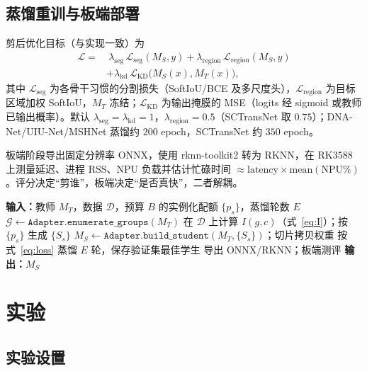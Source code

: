 \documentclass[lettersize,journal]{IEEEtran}
\begin{document}
\subsection{蒸馏重训与板端部署}
\label{sec:distill}
剪后优化目标（与实现一致）为
\begin{equation}
\label{eq:loss}
\begin{aligned}
\mathcal{L}=&\ 
\lambda_{\mathrm{seg}}\,\mathcal{L}_{\mathrm{seg}}(M_S,y)
+\lambda_{\mathrm{region}}\,\mathcal{L}_{\mathrm{region}}(M_S,y)\\
&+\lambda_{\mathrm{kd}}\,\mathcal{L}_{\mathrm{KD}}\!\big(M_S(x),M_T(x)\big),
\end{aligned}
\end{equation}
其中 $\mathcal{L}_{\mathrm{seg}}$ 为各骨干习惯的分割损失（SoftIoU/BCE 及多尺度头），$\mathcal{L}_{\mathrm{region}}$ 为目标区域加权 SoftIoU，$M_T$ 冻结；$\mathcal{L}_{\mathrm{KD}}$ 为输出掩膜的 MSE（logits 经 sigmoid 或教师已输出概率）。默认 $\lambda_{\mathrm{seg}}=\lambda_{\mathrm{kd}}=1$，$\lambda_{\mathrm{region}}=0.5$（SCTransNet 取 $0.75$）；DNA-Net/UIU-Net/MSHNet 蒸馏约 $200$ epoch，SCTransNet 约 $350$ epoch。

板端阶段导出固定分辨率 ONNX，使用 rknn-toolkit2 转为 RKNN，在 RK3588 上测量延迟、进程 RSS、NPU 负载并估计忙碌时间 $\approx\mathrm{latency}\times\mathrm{mean(NPU\%)}$。评分决定“剪谁”，板端决定“是否真快”，二者解耦。

\begin{algorithm}[!t]
\caption{可迁移 IRSTD 压缩协议}
\label{alg:main}
\begin{algorithmic}
\STATE \textbf{输入：}教师 $M_T$，数据 $\mathcal{D}$，预算 $B$ 的实例化配额 $\{p_s\}$，蒸馏轮数 $E$
\STATE $\mathcal{G}\leftarrow \texttt{Adapter.enumerate\_groups}(M_T)$
\STATE 在 $\mathcal{D}$ 上计算 $I(g,c)$（式~\eqref{eq:I}）；按 $\{p_s\}$ 生成 $\{S_s\}$
\STATE $M_S\leftarrow \texttt{Adapter.build\_student}(M_T,\{S_s\})$；切片拷贝权重
\STATE 按式~\eqref{eq:loss} 蒸馏 $E$ 轮，保存验证集最佳学生
\STATE 导出 ONNX/RKNN；板端测评
\STATE \textbf{输出：}$M_S$
\end{algorithmic}
\end{algorithm}

\section{实验}
\label{sec:exp}

\subsection{实验设置}
\label{sec:setup}
\end{document}

